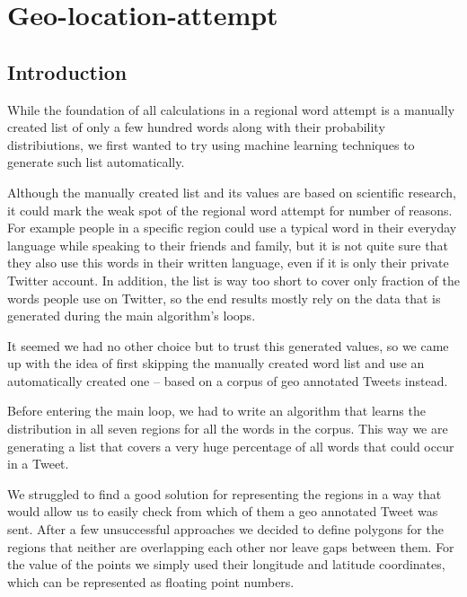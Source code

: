 \documentclass[./Main.tex]{subfiles}
\begin{document}
\section{Geo-location-attempt }
\subsection{Introduction}

While the foundation of all calculations in a regional word attempt is a manually created list of only a few hundred words along with their probability distribiutions, we first wanted to try using machine learning techniques to generate such list automatically.

Although the manually created list and its values are based on scientific research, it could mark the weak spot of the regional word attempt for number of reasons. For example people in a specific region could use a typical word in their everyday language while speaking to their friends and family, but it is not quite sure that they also use this words in their written language, even if it is only their private Twitter account. In addition, the list is way too short to cover only fraction of the words people use on Twitter, so the end results mostly rely on the data that is generated during the main algorithm's loops.

It seemed we had no other choice but to trust this generated values, so we came up with the idea of first skipping the manually created word list and use an automatically created one -- based on a corpus of geo annotated Tweets instead.

Before entering the main loop, we had to write an algorithm that learns the distribution in all seven regions for all the words in the corpus. This way we are generating a list that covers a very huge percentage of all words that could occur in a Tweet.

We struggled to find a good solution for representing the regions in a way that would allow us to easily check from which of them a geo annotated Tweet was sent. After a few unsuccessful approaches we decided to define polygons for the regions that neither are overlapping each other nor leave gaps between them. For the value of the points we simply used their longitude and latitude coordinates, which can be represented as floating point numbers.
\end{document}
